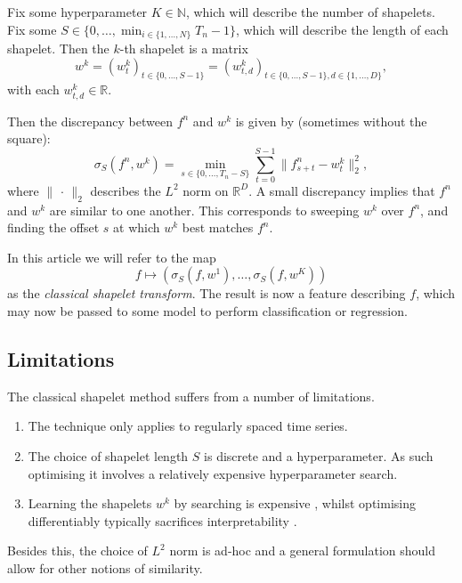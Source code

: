 \documentclass{article}
\theoremstyle{plain}
\theoremstyle{definition}
\newcommand{\reals}{\mathbb{R}}
\newcommand{\naturals}{\mathbb{N}}
\newcommand{\norm}[1]{\|#1\|}
\begin{document}
	Fix some hyperparameter $K \in \naturals$, which will describe the number of shapelets. Fix some $S \in \{0, \ldots, \min_{i \in \{1, \ldots, N\}}T_n - 1\}$, which will describe the length of each shapelet. Then the $k$-th shapelet is a matrix
	\begin{equation*}
	w^{k} = (w^{k}_t)_{t \in \{0, \ldots, S - 1\}} = (w^{k}_{t, d})_{t \in \{0, \ldots, S - 1\}, d \in \{1, \ldots, D\}},
	\end{equation*}
	with each $w^{k}_{t, d} \in \reals$.
	
	Then the discrepancy between $f^n$ and $w^{k}$ is given by (sometimes without the square):
	\begin{equation}\label{eq:classical-shapelets}
	\sigma_S(f^n, w^{k}) = \min_{s \in \{0, \ldots, T_n - S\}} \sum_{t = 0}^{S - 1} \norm{f^n_{s + t} - w^{k}_t}_2^2,
	\end{equation}
	where $\norm{\,\cdot\,}_2$ describes the $L^2$ norm on $\reals^D$. A small discrepancy implies that $f^n$ and $w^{k}$ are similar to one another. This corresponds to sweeping $w^{k}$ over $f^n$, and finding the offset $s$ at which $w^{k}$ best matches $f^n$.
	
	In this article we will refer to the map
	\begin{equation}\label{eq:classical-shapelet-transform}
	f \mapsto (\sigma_S(f, w^{1}), \ldots, \sigma_S(f, w^{K}))
	\end{equation}
	as the \emph{classical shapelet transform}. The result is now a feature describing $f$, which may now be passed to some model to perform classification or regression.
	
	\subsection{Limitations}
	The classical shapelet method suffers from a number of limitations.
	\begin{enumerate}
	\item The technique only applies to regularly spaced time series.
	\item The choice of shapelet length $S$ is discrete and a hyperparameter. As such optimising it involves a relatively expensive hyperparameter search.
	\item Learning the shapelets $w^{k}$ by searching is expensive \cite{ye2009firstshapelet}, whilst optimising differentiably \cite{grabocka2014learningshapelet} typically sacrifices interpretability \cite{wang2019interp}.
	\end{enumerate}
	Besides this, the choice of $L^2$ norm is ad-hoc and a general formulation should allow for other notions of similarity.
	
\end{document}
